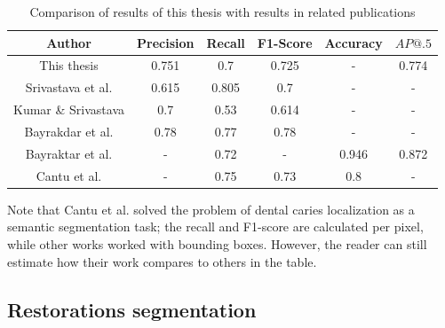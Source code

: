 \begin{table}
    \centering
    \begin{tabular}{|c|c|c|c|c|c|}
        \hline
        Author                                                                 & Precision & Recall & F1-Score & Accuracy & $AP@.5$ \\ \hline
        This thesis                                                            & 0.751     & 0.7    & 0.725    & -        & 0.774   \\ \hline
        Srivastava et al. \cite{Srivastava2017}                                & 0.615     & 0.805  & 0.7      & -        & -       \\ \hline
        Kumar                                   \& Srivastava \cite{Kumar2018} & 0.7       & 0.53   & 0.614    & -        & -       \\ \hline
        Bayrakdar et al. \cite{Bayrakdar2021}                                  & 0.78      & 0.77   & 0.78     & -        & -       \\ \hline
        Bayraktar et al. \cite{Bayraktar2021}                                  & -         & 0.72   & -        & 0.946    & 0.872   \\ \hline
        Cantu et al. \cite{Cantu2020}                                          & -         & 0.75   & 0.73     & 0.8      & -       \\ \hline
    \end{tabular}
    \caption{Comparison of results of this thesis with results in related publications}
    \label{tab:results_comparison}
\end{table}

Note that Cantu et al. \cite{Cantu2020} solved the problem of dental caries localization as a semantic segmentation task; the recall and F1-score are calculated per pixel, while other works worked with bounding boxes. However, the reader can still estimate how their work compares to others in the table.

\subsection{Restorations segmentation}